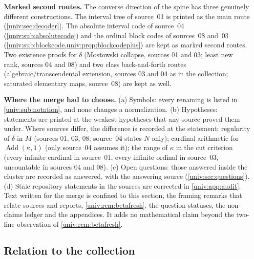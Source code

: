 \documentclass[11pt,letterpaper]{article}
\numberwithin{equation}{section}
\theoremstyle{definition}
\theoremstyle{remark}
\newcommand{\Add}{\operatorname{Add}}
\begin{document}
\textbf{Marked second routes.} The converse direction of the spine has three
genuinely different constructions. The interval tree of source~01 is printed
as the main route (\cref{univ:sec:decoder}). The absolute interval code of
source~04 (\cref{univ:sub:absolutecode}) and the ordinal block codes of
sources~08 and~03 (\cref{univ:sub:blockcode,univ:prop:blockcodeplus}) are kept
as marked second routes. Two existence proofs for $\delta$ (Mostowski
collapse, sources 01 and 03; least new rank, sources 04 and 08) and two
class back-and-forth routes (algebraic/transcendental extension, sources 03
and 04 as in the collection; saturated elementary maps, source~08) are kept as
well.

\textbf{Where the merge had to choose.} (a) Symbols: every renaming is listed
in \cref{univ:sub:notation}, and none changes a normalization. (b)
Hypotheses: statements are printed at the weakest hypotheses that any source
proved them under. Where sources differ, the difference is recorded at the
statement: regularity of $\delta$ in $M$ (sources 01, 03, 08; source~04 states
$N$ only); cardinal arithmetic for $\Add(\kappa,1)$ (only source~04 assumes
it); the range of $\kappa$ in the cut criterion (every infinite cardinal in
source~01, every infinite ordinal in source~03, uncountable in sources 04 and
08). (c) Open questions: those answered inside the cluster are recorded as
answered, with the answering source (\cref{univ:sec:questions}). (d) Stale
repository statements in the sources are corrected in
\cref{univ:app:audit}. Text written for the merge is confined to this section,
the framing remarks that relate sources and reports, \cref{univ:rem:betafresh},
the question statuses, the non-claims ledger and the appendices. It adds no
mathematical claim beyond the two-line observation of
\cref{univ:rem:betafresh}.

\subsection{Relation to the collection}\label{univ:sub:collection}
\end{document}
